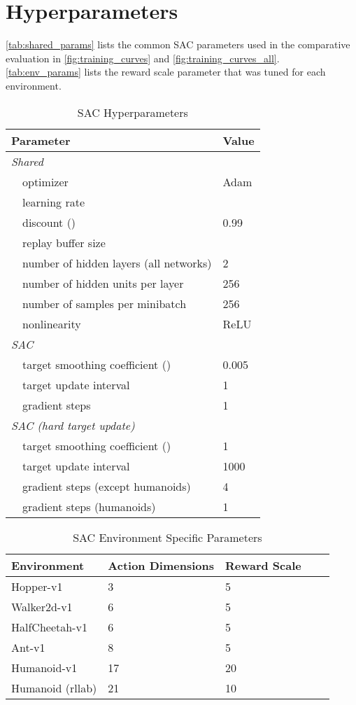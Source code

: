 \documentclass{article}
\begin{document}
\newpage
\section{Hyperparameters}
\label{app:hypers}
\autoref{tab:shared_params} lists the common SAC parameters used in the comparative evaluation in \autoref{fig:training_curves} and \autoref{fig:training_curves_all}. \autoref{tab:env_params} lists the reward scale parameter that was tuned for each environment.

\begin{table}[H]
\renewcommand{\arraystretch}{1.1}
\centering
\caption{SAC Hyperparameters}
\label{tab:shared_params}
\vspace{1mm}
\begin{tabular}{l l| l }
\toprule
\multicolumn{2}{l|}{Parameter} &  Value\\
\midrule
\multicolumn{2}{l|}{\it{Shared}}& \\
& optimizer &Adam \citep{kingma2014adam}\\
& learning rate & \\
& discount () &  0.99\\
& replay buffer size & \\
& number of hidden layers (all networks) & 2\\
& number of hidden units per layer & 256\\
& number of samples per minibatch & 256\\
& nonlinearity & ReLU\\
\midrule
\multicolumn{2}{l|}{\it{SAC}}& \\
& target smoothing coefficient ()& 0.005\\
& target update interval & 1\\
& gradient steps & 1\\
\midrule
\multicolumn{2}{l|}{\it{SAC (hard target update)}}& \\
& target smoothing coefficient ()& 1\\
& target update interval & 1000\\
& gradient steps (except humanoids)& 4\\
& gradient steps (humanoids)& 1\\
\bottomrule
\end{tabular}
\end{table}

\begin{table}[H]
\renewcommand{\arraystretch}{1.1}
\centering
\caption{SAC Environment Specific Parameters}
\label{tab:env_params}
\vspace{1mm}
\begin{tabular}{ l l l l l }
\toprule
Environment 		&Action Dimensions	&Reward Scale\\
\midrule
Hopper-v1 			&3		& 5\\
Walker2d-v1 		&6 		& 5\\
HalfCheetah-v1 		&6		& 5\\
Ant-v1 				&8		& 5\\
Humanoid-v1 	    &17 	& 20\\
Humanoid (rllab) 	&21 	& 10\\
\bottomrule
\end{tabular}
\end{table}
\end{document}
